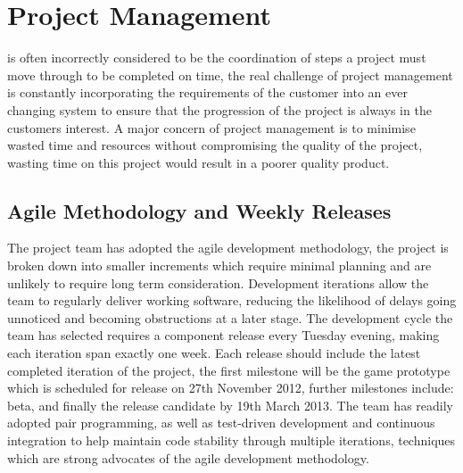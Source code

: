\chapter[Project Management]{Project Management}
\label{ch:management}


\begin{fullwidth}

 is often incorrectly considered to be the coordination of steps a project must move through to be completed on time, the real challenge of project management is constantly incorporating the requirements of the customer into an ever changing system to ensure that the progression of the project is always in the customers interest. A major concern of project management is to minimise wasted time and resources without compromising the quality of the project, wasting time on this project would result in a poorer quality product.






\section{Agile Methodology and Weekly Releases}

\begin{fullwidth}

The project team has adopted the agile development methodology, the project is broken down into smaller increments which require minimal planning and are unlikely to require long term consideration. Development iterations allow the team to regularly deliver working software, reducing the likelihood of delays going unnoticed and becoming obstructions at a later stage. The development cycle the team has selected requires a component release every Tuesday evening, making each iteration span exactly one week. Each release should include the latest completed iteration of the project, the first milestone will be the game prototype which is scheduled for release on 27th November 2012, further milestones include: beta, and finally the release candidate by 19th March 2013.
The team has readily adopted pair programming, as well as test-driven development and continuous integration to help maintain code stability through multiple iterations, techniques which are strong advocates of the agile development methodology.


\end{fullwidth}
\end{fullwidth}

